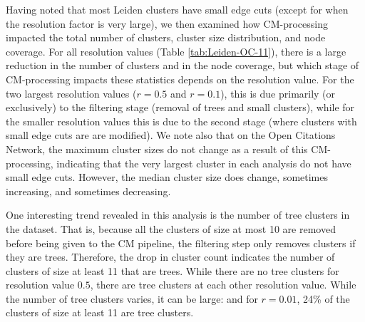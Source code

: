 \documentclass[11pt]{article}   	%
\begin{document}
Having noted that most Leiden clusters have small edge cuts (except for when the resolution factor is very large), we then examined how CM-processing impacted the total number of clusters, cluster size distribution, and node coverage.
For all resolution values (Table \ref{tab:Leiden-OC-11}), there is a large reduction in the number of clusters and in the node coverage, but which stage of CM-processing impacts these statistics depends on the resolution value.
For the  two largest resolution values ($r=0.5$ and $r=0.1$), this is
due primarily (or exclusively) to the filtering stage (removal of trees and small clusters),
while  for the smaller resolution values this is due to the second stage (where clusters with small edge cuts are are modified). 
We note also that on the Open Citations Network,  the maximum cluster sizes do not change as a result of this CM-processing, indicating that the very largest cluster in each analysis  do not have small edge cuts.  However, the median cluster size does change, sometimes increasing,  and sometimes decreasing.

One interesting trend revealed in this analysis is the number of tree clusters in the dataset.
That is, because all the clusters of size at most 10 are removed before being given to the CM pipeline, the filtering
step only removes clusters if they are trees.
Therefore, the drop in cluster count indicates the number of clusters of size at least 11 that are trees.
While there are no tree clusters for resolution value $0.5$,  there are tree clusters at each other resolution value.
While the number of tree clusters varies, it can be large: and for $r=0.01$, 24\% of the clusters of size at least 11 are tree clusters.
\end{document}

